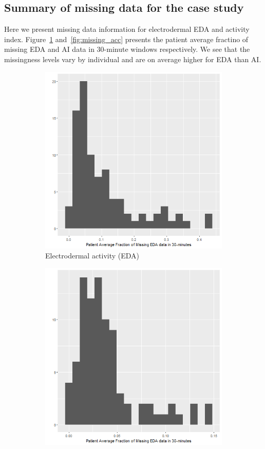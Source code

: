 \documentclass[12pt]{amsart}
\begin{document}
\subsection{Summary of missing data for the case study}
\label{app:csmissing}

Here we present missing data information for electrodermal EDA and activity index.  Figure~\ref{fig:missing_eda} and~\ref{fig:missing_acc} presents the patient average fractino of missing EDA and AI data in 30-minute windows respectively. We see that the missingness levels vary by individual and are on average higher for EDA than AI.


\begin{figure}[!th]
\centering
\begin{subfigure}{.5\textwidth}
  \centering
  \includegraphics[width=.8\linewidth]{../figures/missing_data_eda.png}
  \caption{Electrodermal activity (EDA)}
  \label{fig:missing_eda}
\end{subfigure}%
\begin{subfigure}{.5\textwidth}
  \centering
  \includegraphics[width=.8\linewidth]{../figures/missing_data_ai.png}

\end{subfigure}
\end{figure}
\end{document}
